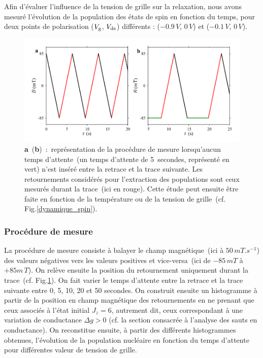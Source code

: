 Afin d'évaluer l'influence de la tension de grille sur la relaxation, nous avons mesuré l'évolution de la population des états de spin en fonction du temps, pour deux points de polarisation ($V_{\rm{g}}$, $V_{\rm{ds}}$) différents : ($-0.9\, V$, $0\, V$) et ($-0.1\, V$, $0\, V$).

\begin{figure}
\centering \includegraphics[scale=0.45]{Resultats/PostFig2/postfig2.png} 
\caption{\textbf{a}~(\textbf{b})~:~représentation de la procédure de mesure lorsqu'aucun temps d'attente~(un temps d'attente de 5\, secondes, représenté en vert) n'est inséré entre la retrace et la trace suivante. Les retournements considérés pour l'extraction des populations sont ceux mesurés durant la trace~(ici en rouge). Cette étude peut ensuite être faite en fonction de la température ou de la tension de grille~(cf. Fig.\ref{dynamique_spin}).}
\label{procedure2}
\end{figure}

\subsubsection{Procédure de mesure}
La procédure de mesure consiste à balayer le champ magnétique~(ici à $50\,mT.s^{-1}$) des valeurs négatives vers les valeurs positives et vice-versa~(ici de $-85\,mT$ à $+85m\,T$). On relève ensuite la position du retournement uniquement durant la trace~(cf. Fig.\ref{procedure2}). On fait varier le temps d'attente entre la retrace et la trace suivante entre 0, 5, 10, 20 et 50 secondes. On construit ensuite un histogramme à partir de la position en champ magnétique des retournements en ne prenant que ceux associés à l'état initial $J_z= 6$, autrement dit, ceux correspondant à une variation de conductance $\Delta g >0$ (cf. la section consacrée à l'analyse des sauts en conductance). On reconstitue ensuite, à partir des différents histogrammes obtenues, l'évolution de la population nucléaire en fonction du temps d'attente pour différentes valeur de tension de grille.

